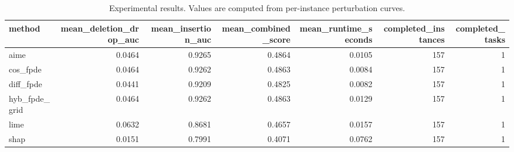 \begin{table}[t]
\caption{Experimental results. Values are computed from per-instance perturbation curves.}
\label{tab:main_results_computed}
\centering
\begin{tabular}{lrrrrrr}
\toprule
method & mean\_deletion\_drop\_auc & mean\_insertion\_auc & mean\_combined\_score & mean\_runtime\_seconds & completed\_instances & completed\_tasks \\
\midrule
aime & 0.0464 & 0.9265 & 0.4864 & 0.0105 & 157 & 1 \\
cos\_fpde & 0.0464 & 0.9262 & 0.4863 & 0.0084 & 157 & 1 \\
diff\_fpde & 0.0441 & 0.9209 & 0.4825 & 0.0082 & 157 & 1 \\
hyb\_fpde\_grid & 0.0464 & 0.9262 & 0.4863 & 0.0129 & 157 & 1 \\
lime & 0.0632 & 0.8681 & 0.4657 & 0.0157 & 157 & 1 \\
shap & 0.0151 & 0.7991 & 0.4071 & 0.0762 & 157 & 1 \\
\bottomrule
\end{tabular}

\end{table}
